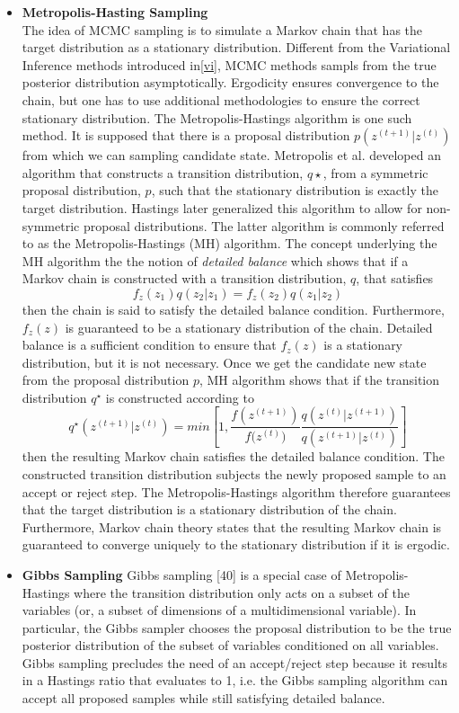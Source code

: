 	\begin{itemize}
		\item \textbf{Metropolis-Hasting Sampling}\\
		The idea of MCMC sampling is to simulate a Markov chain that has the target distribution as a stationary distribution. Different from the Variational Inference methods introduced in\ref{vi}, MCMC methods sampls from the true posterior distribution asymptotically. Ergodicity ensures convergence to the chain, but one has to use additional methodologies to ensure the correct stationary distribution. The Metropolis-Hastings algorithm is one such method.
		It is supposed that there is a proposal distribution $p(z^{(t+1)}|z^{(t)})$ from which we can sampling candidate state. Metropolis et al.\cite{Metropolis1953} developed an algorithm that constructs a transition distribution, $q\star$, from a symmetric proposal distribution, $p$, such that the stationary distribution is exactly the target distribution. Hastings\cite{Hastings1970} later generalized this algorithm to allow for non-symmetric proposal distributions. The latter algorithm is commonly referred to as the Metropolis-Hastings (MH) algorithm. The concept underlying the MH algorithm the the notion of \textit{detailed balance} which shows that if a Markov chain is constructed with a transition distribution, $q$, that satisfies 
		\begin{equation}
			f_z(z_1)q(z_2|z_1)=f_z(z_2)q(z_1|z_2)
		\end{equation}
		then the chain is said to satisfy the detailed balance condition. Furthermore,  $f_z(z)$ is
		guaranteed to be a stationary distribution of the chain. Detailed balance is a sufficient condition to ensure that  $f_z(z)$ is a stationary distribution, but it is not necessary. Once we get the candidate new state from the proposal distribution $p$, MH algorithm shows that if the transition distribution $q^\star$ is constructed according to
		\begin{equation}
			q^{\star}(z^{(t+1)}|z^{(t)})=min[1,\frac{f(z^{(t+1)})}{f{(z^(t)})}\frac{q(z^(t)|z^{(t+1)})}{q(z^{(t+1)}|z^{(t)})}]
		\end{equation}
		then the resulting Markov chain satisfies the detailed balance condition. The constructed transition distribution subjects the newly proposed sample to an accept or reject step.
		The Metropolis-Hastings algorithm therefore guarantees that the target distribution is a stationary distribution of the chain. Furthermore, Markov chain theory states that the resulting Markov chain is guaranteed to converge uniquely to the stationary distribution if it is ergodic.
		\item \textbf{Gibbs Sampling}
		 Gibbs sampling [40] is a special case of Metropolis-Hastings where the transition distribution only acts on a subset of the variables (or, a subset of dimensions of a multidimensional variable). In particular, the Gibbs sampler chooses the proposal distribution to be the true posterior distribution of the subset of variables conditioned on all variables. Gibbs sampling precludes the need of an accept/reject step because it results in a Hastings ratio that evaluates to 1, i.e. the Gibbs sampling algorithm can accept all proposed samples while still satisfying detailed balance. 
		 

\end{itemize}

